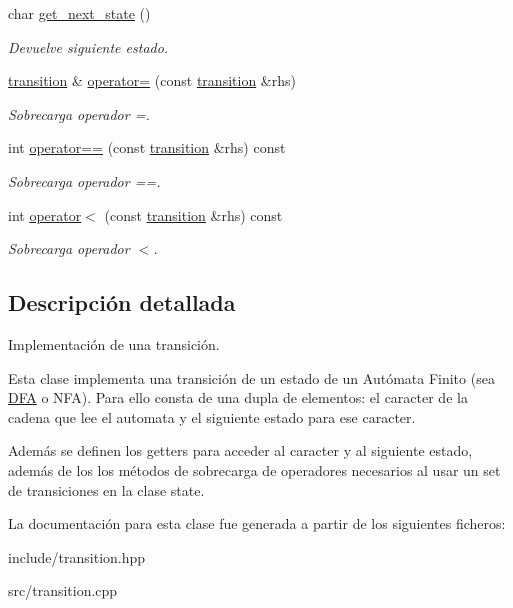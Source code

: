 \begin{DoxyCompactItemize}
\mbox{\label{classtransition_ae61d6267fd639c7c9c33110690380d02}} 
char \mbox{\hyperlink{classtransition_ae61d6267fd639c7c9c33110690380d02}{get\+\_\+next\+\_\+state}} ()
\begin{DoxyCompactList}\small\item\em Devuelve siguiente estado. \end{DoxyCompactList}\item 
\mbox{\label{classtransition_a19ff0a62d44b9e704c0d0febb5d4b935}} 
\mbox{\hyperlink{classtransition}{transition}} \& \mbox{\hyperlink{classtransition_a19ff0a62d44b9e704c0d0febb5d4b935}{operator=}} (const \mbox{\hyperlink{classtransition}{transition}} \&rhs)
\begin{DoxyCompactList}\small\item\em Sobrecarga operador =. \end{DoxyCompactList}\item 
\mbox{\label{classtransition_aec5d35db88d6f0e23bad3e6d54cb2795}} 
int \mbox{\hyperlink{classtransition_aec5d35db88d6f0e23bad3e6d54cb2795}{operator==}} (const \mbox{\hyperlink{classtransition}{transition}} \&rhs) const
\begin{DoxyCompactList}\small\item\em Sobrecarga operador ==. \end{DoxyCompactList}\item 
\mbox{\label{classtransition_ae7d0d78dff4788d1d69447f82918e701}} 
int \mbox{\hyperlink{classtransition_ae7d0d78dff4788d1d69447f82918e701}{operator$<$}} (const \mbox{\hyperlink{classtransition}{transition}} \&rhs) const
\begin{DoxyCompactList}\small\item\em Sobrecarga operador $<$. \end{DoxyCompactList}\end{DoxyCompactItemize}


\subsection{Descripción detallada}
Implementación de una transición. 

Esta clase implementa una transición de un estado de un Autómata Finito (sea \mbox{\hyperlink{class_d_f_a}{D\+FA}} o N\+FA). Para ello consta de una dupla de elementos\+: el caracter de la cadena que lee el automata y el siguiente estado para ese caracter.

Además se definen los getters para acceder al caracter y al siguiente estado, además de los los métodos de sobrecarga de operadores necesarios al usar un set de transiciones en la clase state. 

La documentación para esta clase fue generada a partir de los siguientes ficheros\+:\begin{DoxyCompactItemize}
\item 
include/transition.\+hpp\item 
src/transition.\+cpp\end{DoxyCompactItemize}
